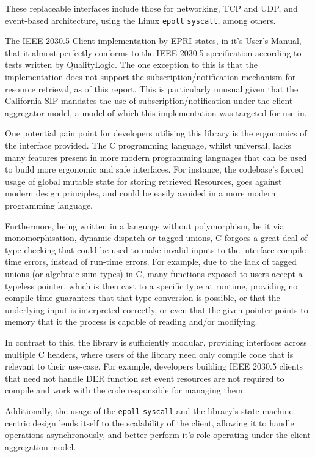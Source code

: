 These replaceable interfaces include those for networking, TCP and UDP, and event-based architecture, using the Linux \texttt{epoll} \texttt{syscall}, among others.

The IEEE 2030.5 Client implementation by EPRI states, in it's User's Manual, that it almost perfectly conforms to the IEEE 2030.5 specification according to tests written by QualityLogic.
The one exception to this is that the implementation does not support the subscription/notification mechanism for resource retrieval, as of this report.
This is particularly unusual given that the California SIP mandates the use of subscription/notification under the client aggregator model, a model of which this implementation was targeted for use in.

One potential pain point for developers utilising this library is the ergonomics of the interface provided. The C programming language, whilst universal, lacks many features present in more modern programming languages that can be used to build more ergonomic and safe interfaces. For instance, the codebase's forced usage of global mutable state for storing retrieved Resources, goes against modern design principles, and could be easily avoided in a more modern programming language. 

Furthermore, being written in a language without polymorphism, be it via monomorphisation, dynamic dispatch or tagged unions, C forgoes a great deal of type checking that could be used to make invalid inputs to the interface compile-time errors, instead of run-time errors. For example, due to the lack of tagged unions (or algebraic sum types) in C, many functions exposed to users accept a typeless pointer, which is then cast to a specific type at runtime, providing no compile-time guarantees that that type conversion is possible, or that the underlying input is interpreted correctly, or even that the given pointer points to memory that it the process is capable of reading and/or modifying.

In contrast to this, the library is sufficiently modular, providing interfaces across multiple C headers, where users of the library need only compile code that is relevant to their use-case. For example, developers building IEEE 2030.5 clients that need not handle DER function set event resources are not required to compile and work with the code responsible for managing them.

Additionally, the usage of the \texttt{epoll} \texttt{syscall} and the library's state-machine centric design lends itself to the scalability of the client, allowing it to handle operations asynchronously, and better perform it's role operating under the client aggregation model. \cite[]{eprimanual}

